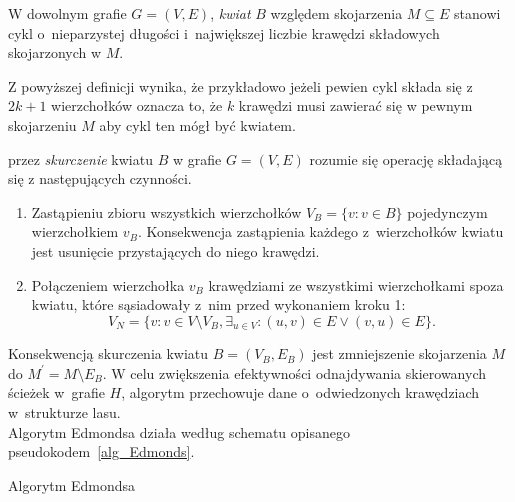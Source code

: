 \par{
  \begin{definition}
    W dowolnym grafie $G=(V, E)$, \emph{kwiat} $B$ względem skojarzenia $M \subseteq E$ stanowi cykl o~nieparzystej długości i~największej liczbie krawędzi składowych skojarzonych w $M$. 
  \end{definition}
  Z powyższej definicji wynika, że przykładowo jeżeli pewien cykl składa się z $2k + 1$ wierzchołków oznacza to, że $k$ krawędzi musi zawierać się w pewnym skojarzeniu $M$ aby cykl ten mógł być kwiatem.
  \begin{definition}
    przez \emph{skurczenie} kwiatu $B$ w grafie $G=(V, E)$ rozumie się operację składającą się z następujących czynności.
    \begin{enumerate}
       \item Zastąpieniu zbioru wszystkich wierzchołków $V_B=\{v: v \in B\}$ pojedynczym wierzchołkiem $v_B$. Konsekwencja zastąpienia każdego z~wierzchołków kwiatu jest usunięcie przystających do niego krawędzi.
       \item Połączeniem wierzchołka $v_B$ krawędziami ze wszystkimi wierzchołkami spoza kwiatu, które sąsiadowały z~nim przed wykonaniem kroku 1: \[V_N=\{v: v \in V \setminus V_B, \exists_{u \in V}:(u,v)\in E \lor (v, u)\in E\}.\]
     \end{enumerate}
  \end{definition}
  Konsekwencją skurczenia kwiatu $B=(V_B, E_B)$ jest zmniejszenie skojarzenia $M$ do $M^\prime = M \setminus E_B$.
  W celu zwiększenia efektywności odnajdywania skierowanych ścieżek w~grafie $H$, algorytm przechowuje dane o~odwiedzonych krawędziach w~strukturze lasu.\\
  Algorytm Edmondsa działa według schematu opisanego pseudokodem~\ref{alg_Edmonds}.
  \begin{algorithm}
    \caption{Algorytm Edmondsa}\label{alg_Edmonds}
    \begin{algorithmic}[1]




\end{algorithmic}
\end{algorithm}}
